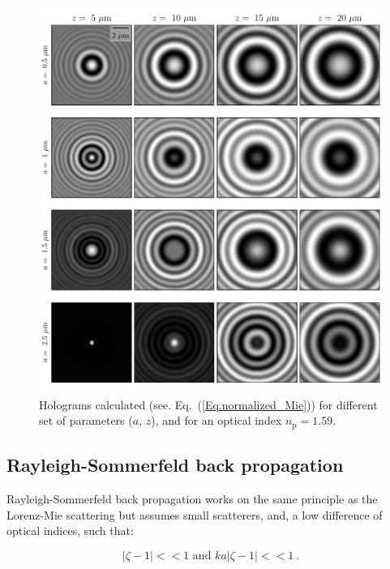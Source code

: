 \begin{figure}
	\centering
	\includegraphics{02_body/chapter2/images/holo_size_exemple/holos_fix_n.pdf}
	\caption{Holograms calculated (see. Eq.~(\ref{Eq.normalized_Mie})) for different set of parameters ($a$, $z$), and for an optical index $n_\mathrm{p} = 1.59$.~\href{https://github.com/eXpensia/Confined-Brownian-Motion/blob/main/02_body/chapter2/images/holo_size_exemple/holosize_variation.ipynb}{\faGithub}}
	\label{fig:holo_fix_n}
\end{figure}

\clearpage
\newpage

\subsection{Rayleigh-Sommerfeld back propagation}





Rayleigh-Sommerfeld back propagation \cite{wilson_3d_2012} works on the same principle as the Lorenz-Mie scattering but assumes small scatterers, and, a low difference of optical indices, such that:

\begin{equation}
	|\zeta - 1| << 1 \text{ and } ka|\zeta - 1| << 1 ~.
\end{equation}


